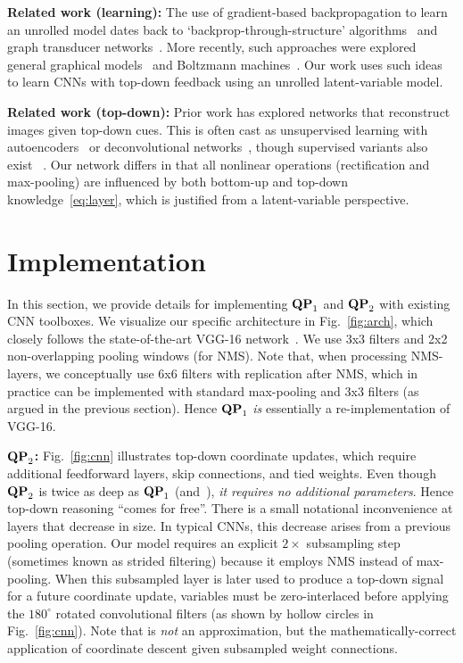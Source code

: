 \documentclass[10pt,twocolumn,letterpaper]{article}
\newcommand{\QP}[1]{{${\bf QP}_{#1}$}}
\begin{document}
{\bf Related work (learning):} The use of gradient-based
backpropagation to learn an unrolled model dates back to
`backprop-through-structure'
algorithms~\cite{goller1996learning,socher2011parsing} and graph
transducer networks~\cite{lecun1998gradient}. More recently, such
approaches were explored general graphical
models~\cite{stoyanov2011empirical} and Boltzmann
machines~\cite{goodfellow2013multi}. Our work uses such ideas to learn
CNNs with top-down feedback using an unrolled latent-variable
model.

{\bf Related work (top-down):} Prior work has explored networks that
reconstruct images given top-down cues. This is often cast as
unsupervised learning with
autoencoders~\cite{hinton2006reducing,vincent2010stacked,masci2011stacked}
or deconvolutional networks~\cite{zeiler2010deconvolutional}, though
supervised variants also exist
~\cite{long2014fully,noh2015learning}. Our network differs in that all
nonlinear operations (rectification and max-pooling) are influenced by
both bottom-up and top-down knowledge~\eqref{eq:layer}, which is
justified from a latent-variable perspective.

\section{Implementation}
\label{sec:imp}
In this section, we provide details for implementing \QP{1} and
\QP{2} with existing CNN toolboxes. We visualize our specific
architecture in Fig.~\ref{fig:arch}, which closely follows the
state-of-the-art VGG-16 network~\cite{simonyan2014very}. We use 3x3
filters and 2x2 non-overlapping pooling windows (for NMS). Note that,
when processing NMS-layers, we conceptually use 6x6 filters with
replication after NMS, which in practice can be implemented with
standard max-pooling and 3x3 filters (as argued in the previous
section). Hence \QP{1} {\em is} essentially a re-implementation of
VGG-16.

{\bf \QP{2}:} Fig.~\ref{fig:cnn} illustrates top-down coordinate
updates, which require additional feedforward layers, skip
connections, and tied weights. Even though \QP{2} is twice as deep
as \QP{1} (and~\cite{simonyan2014very}), {\em it requires no
  additional parameters}. Hence top-down reasoning ``comes for
free''. There is a small notational inconvenience at layers that
decrease in size. In typical CNNs, this decrease arises from a
previous pooling operation. Our model requires an explicit $2\times$
subsampling step (sometimes known as strided filtering) because it
employs NMS instead of max-pooling. When this subsampled layer is
later used to produce a top-down signal for a future coordinate
update, variables must be zero-interlaced before applying the
$180^\circ$ rotated convolutional filters (as shown by hollow circles
in Fig.~\ref{fig:cnn}). Note that is {\em not} an approximation, but
the mathematically-correct application of coordinate descent given
subsampled weight connections.
\end{document}
